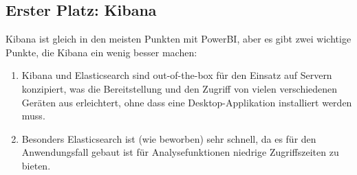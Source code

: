 \subsection{Erster Platz: Kibana}
Kibana ist gleich in den meisten Punkten mit PowerBI, aber es gibt zwei wichtige Punkte, die Kibana ein wenig besser machen:
\begin{enumerate}
\item Kibana und Elasticsearch sind out-of-the-box für den Einsatz auf Servern konzipiert, was die Bereitstellung und den Zugriff von vielen verschiedenen Geräten aus erleichtert, ohne dass eine Desktop-Applikation installiert werden muss.
\item Besonders Elasticsearch ist (wie beworben) sehr schnell, da es für den Anwendungsfall gebaut ist für Analysefunktionen niedrige Zugriffszeiten zu bieten.
\end{enumerate}